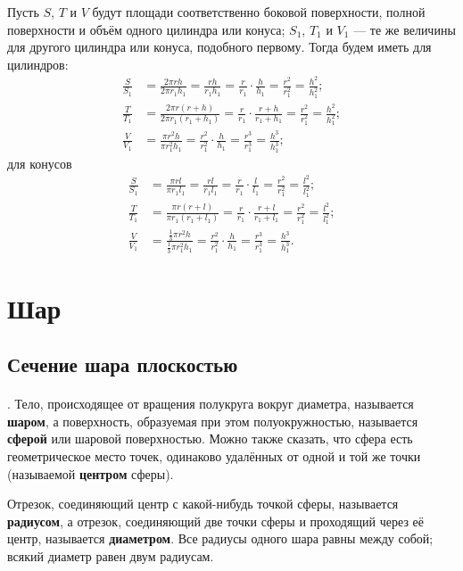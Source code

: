 Пусть $S$, $T$ и $V$ будут площади соответственно боковой поверхности, полной поверхности и объём одного цилиндра или конуса;
$S_1$, $T_1$ и $V_1$ — те же величины для другого цилиндра или конуса, подобного первому.
Тогда будем иметь для цилиндров:
\begin{align*}
\frac S{S_1}&=
\frac{2\pi rh}{2\pi r_1h_1}=
\frac{rh}{r_1h_1}=
\frac{r}{r_1}\cdot \frac{h}{h_1}=
\frac{r^2}{r_1^2}=
\frac{h^2}{h_1^2};
\\
\frac T{T_1}&=
\frac{2\pi r(r+h)}{2\pi r_1(r_1+h_1)}=
\frac{r}{r_1}\cdot\frac{r+h}{r_1+h_1}=
\frac{r^2}{r_1^2}=
\frac{h^2}{h_1^2};
\\
\frac V{V_1}&=
\frac{\pi r^2h}{\pi r_1^2h_1}=
\frac{r^2}{r_1^2}\cdot \frac{h}{h_1}=
\frac{r^3}{r_1^3}=
\frac{h^3}{h_1^3};
\end{align*}
для конусов
\begin{align*}
\frac S{S_1}&=
\frac{\pi rl}{\pi r_1l_1}=
\frac{rl}{r_1l_1}=
\frac{r}{r_1}\cdot \frac{l}{l_1}=
\frac{r^2}{r_1^2}=
\frac{l^2}{l_1^2};
\\
\frac T{T_1}&=
\frac{\pi r(r+l)}{\pi r_1(r_1+l_1)}=
\frac{r}{r_1}\cdot\frac{r+l}{r_1+l_1}=
\frac{r^2}{r_1^2}=
\frac{l^2}{l_1^2};
\\
\frac V{V_1}&=
\frac{\frac13\pi r^2h}{\frac13\pi r_1^2h_1}=
\frac{r^2}{r_1^2}\cdot \frac{h}{h_1}=
\frac{r^3}{r_1^3}=
\frac{h^3}{h_1^3}.
\end{align*}

\section{Шар}

\subsection*{Сечение шара плоскостью}

\paragraph{}\label{1938/s125}
.
Тело, происходящее от вращения полукруга вокруг диаметра, называется \textbf{шаром}, а поверхность, образуемая при этом полуокружностью, называется \textbf{сферой} или шаровой поверхностью.
Можно также сказать, что сфера есть геометрическое место точек, одинаково удалённых от одной и той же точки (называемой \textbf{центром} сферы).

Отрезок, соединяющий центр с какой-нибудь точкой сферы, называется \textbf{радиусом}, а отрезок, соединяющий две точки сферы и проходящий через её центр, называется \textbf{диаметром}.
Все радиусы одного шара равны между собой;
всякий диаметр равен двум радиусам.

